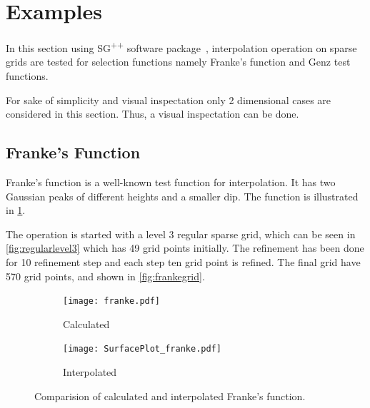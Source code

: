 
\section{Examples}\label{sec:example}

In this section using SG\textsuperscript{++} software package~\cite{pflueger10spatially},
interpolation operation on sparse grids are tested for selection functions namely
Franke's function and Genz test functions.

For sake of simplicity and visual inspectation only 2 dimensional cases are considered in this section.
Thus, a visual inspectation can be done.

\subsection{Franke's Function}\label{subsec:frankeexample}

Franke's function is a well-known test function for interpolation.
It has two Gaussian peaks of different heights and a smaller dip.
The function is illustrated in \cref{fig:fullfranke}.

The operation is started with a level 3 regular sparse grid, which can be seen
in \cref{fig:regularlevel3} which has 49 grid points initially.
The refinement has been done for 10 refinement step and each step ten grid point is refined.
The final grid have 570 grid points, and shown in \cref{fig:frankegrid}.

\begin{figure}
    \centering
    \begin{subfigure}{0.45\textwidth}
        \texttt{[image: franke.pdf]}
        \caption{Calculated}
        \label{fig:fullfranke}
    \end{subfigure}
    \begin{subfigure}{0.45\textwidth}
        \texttt{[image: SurfacePlot\_franke.pdf]}
        \caption{Interpolated}
        \label{fig:interpolatedfranke}
    \end{subfigure}
    \caption{Comparision of calculated and interpolated Franke's function.}
    \label{fig:frankesurfaceplots}
\end{figure}

